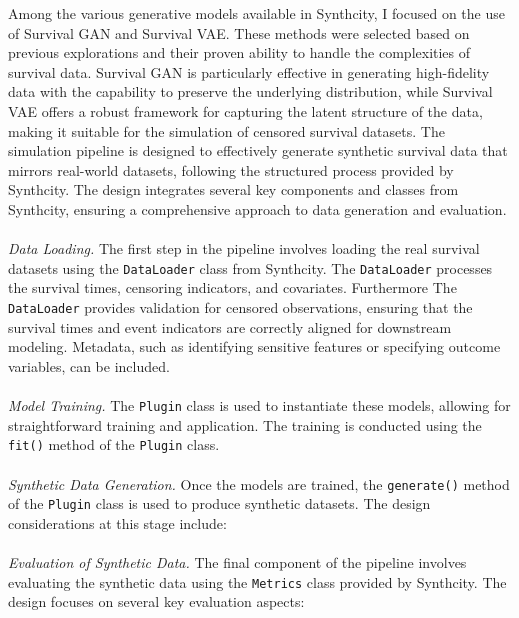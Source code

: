 \noindent Among the various generative models available in Synthcity, I focused on the use of Survival GAN and Survival VAE. These methods were selected based on previous explorations and their proven ability to handle the complexities of survival data. Survival GAN is particularly effective in generating high-fidelity data with the capability to preserve the underlying distribution, while Survival VAE offers a robust framework for capturing the latent structure of the data, making it suitable for the simulation of censored survival datasets.
The simulation pipeline is designed to effectively generate synthetic survival data that mirrors real-world datasets, following the structured process provided by Synthcity. The design integrates several key components and classes from Synthcity, ensuring a comprehensive approach to data generation and evaluation.
\\\\
\noindent \textit{Data Loading.} The first step in the pipeline involves loading the real survival datasets using the \texttt{DataLoader} class from Synthcity. The \texttt{DataLoader} processes the survival times, censoring indicators, and covariates. Furthermore The \texttt{DataLoader} provides validation for censored observations, ensuring that the survival times and event indicators are correctly aligned for downstream modeling. Metadata, such as identifying sensitive features or specifying outcome variables, can be included.
\\\\
\noindent \textit{Model Training.} The \texttt{Plugin} class is used to instantiate these models, allowing for straightforward training and application. The training is conducted using the \texttt{fit()} method of the \texttt{Plugin} class.
\\\\
\noindent \textit{Synthetic Data Generation.} Once the models are trained, the \texttt{generate()} method of the \texttt{Plugin} class is used to produce synthetic datasets. The design considerations at this stage include:
\\\\
\noindent \textit{Evaluation of Synthetic Data.} The final component of the pipeline involves evaluating the synthetic data using the \texttt{Metrics} class provided by Synthcity. The design focuses on several key evaluation aspects:
